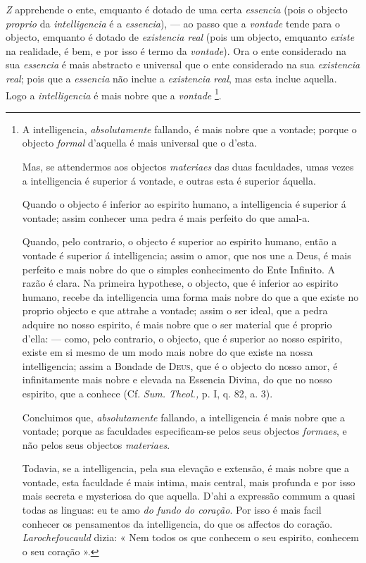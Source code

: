 




\emph{Z} apprehende o ente, emquanto é dotado de uma certa \emph{essencia}   (pois o objecto \emph{proprio} da \emph{intelligencia} é a \emph{essencia}), --- ao passo que a \emph{vontade} tende para o objecto, emquanto é dotado de \emph{existencia real} (pois um objecto, emquanto \emph{existe} na realidade, é bem, e por isso é termo da \emph{vontade}). Ora o ente considerado   na sua \emph{essencia} é mais abstracto e universal que o ente considerado na sua \emph{existencia real}; pois que a \emph{essencia} não inclue a \emph{existencia real}, mas esta inclue aquella. Logo a \emph{intelligencia} é mais nobre que a \emph{vontade} \footnote{A intelligencia, \emph{absolutamente} fallando, é mais nobre que a vontade; porque o objecto \emph{formal} d'aquella é mais universal que o d'esta.\par Mas, se attendermos aos objectos \emph{materiaes} das duas faculdades, umas vezes a intelligencia é superior á vontade, e outras esta é superior áquella.\par Quando o objecto é inferior ao espirito humano, a intelligencia é superior á vontade; assim conhecer uma pedra é mais perfeito do que amal-a.\par Quando, pelo contrario, o objecto é superior ao espirito humano, então a vontade é superior á intelligencia; assim o amor, que nos une a Deus, é mais perfeito e mais nobre do que o simples conhecimento do Ente Infinito. A razão é clara. Na primeira hypothese, o objecto, que é inferior ao espirito humano, recebe da intelligencia uma forma mais nobre do que a que existe no proprio objecto e que attrahe a vontade; assim o ser ideal, que a pedra adquire no nosso espirito, é mais nobre que o ser material que é proprio d'ella: --- como, pelo contrario, o objecto, que é superior ao nosso espirito, existe em si mesmo de um modo mais nobre do que existe na nossa intelligencia; assim a Bondade de \textsc{Deus}, que é o objecto do nosso amor, é infinitamente mais nobre e elevada na Essencia Divina, do que no nosso espirito, que a conhece (Cf. \emph{Sum. Theol.,} p. I, q. 82, a. 3).\par Concluimos que, \emph{absolutamente} fallando, a intelligencia é mais nobre que a vontade; porque as faculdades especificam-se pelos seus objectos \emph{formaes}, e não pelos seus objectos \emph{materiaes}.\par Todavia, se a intelligencia, pela sua elevação e extensão, é mais nobre que a vontade, esta faculdade é mais intima, mais central, mais profunda e por isso mais secreta e mysteriosa do que aquella. D'ahi a expressão commum a quasi todas as linguas: eu te amo \emph{do fundo do coração}. Por isso é mais facil conhecer os pensamentos da intelligencia, do que os affectos do coração. \emph{Larochefoucauld} dizia: « Nem todos os que conhecem o seu espirito, conhecem o seu coração ».}.

